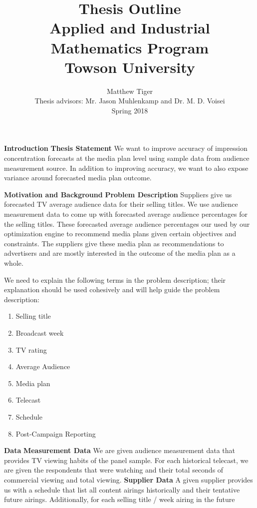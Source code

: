 \documentclass{article}
\title{Thesis Outline \\ Applied and Industrial Mathematics Program \\ Towson University}
\author{Matthew Tiger \\ Thesis advisors:  Mr. Jason Muhlenkamp and Dr. M. D. Voisei \\ Spring 2018}
\begin{document}
\maketitle

\begin{outline}[enumerate]
    \1 \textbf{Introduction}
        \2 \textbf{Thesis Statement}
            We want to improve accuracy of impression concentration forecasts at the media plan level
            using sample data from audience measurement source. In addition to improving accuracy, we
            want to also expose variance around forecasted media plan outcome.

   \1 \textbf{Motivation and Background}
       \2 \textbf{Problem Description}
           Suppliers give us forecasted TV average audience data for their selling titles. We use
           audience measurement data to come up with forecasted average audience percentages for the selling titles.
           These forecasted average audience percentages our used by our optimization engine to recommend media plans
           given certain objectives and constraints. The suppliers give these media plan as recommendations to
           advertisers and are mostly interested in the outcome of the media plan as a whole.

           We need to explain the following terms in the problem description; their explanation should be used
           cohesively and will help guide the problem description:
           \begin{enumerate}
               \item Selling title
               \item Broadcast week
               \item TV rating
               \item Average Audience
               \item Media plan
               \item Telecast
               \item Schedule
               \item Post-Campaign Reporting
           \end{enumerate}

       \2 \textbf{Data}
           \3 \textbf{Measurement Data}
               We are given audience measurement data that provides TV viewing habits
               of the panel sample. For each historical telecast, we are given the respondents
               that were watching and their total seconds of commercial viewing and total viewing.
           \3 \textbf{Supplier Data}
               A given supplier provides us with a schedule that list all content airings
               historically and their tentative future airings. Additionally, for each selling title / week
               airing in the future


\end{outline}
\end{document}
